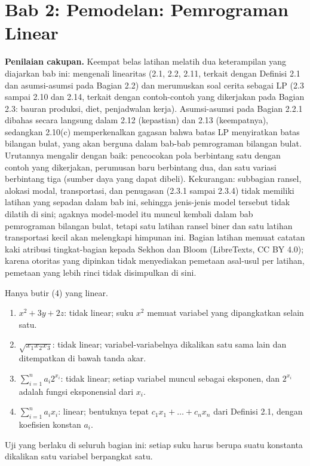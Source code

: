 \section{Bab 2: Pemodelan: Pemrograman Linear}

\textbf{Penilaian cakupan.} Keempat belas latihan melatih dua keterampilan yang diajarkan bab ini: mengenali linearitas (2.1, 2.2, 2.11, terkait dengan Definisi 2.1 dan asumsi-asumsi pada Bagian 2.2) dan merumuskan soal cerita sebagai LP (2.3 sampai 2.10 dan 2.14, terkait dengan contoh-contoh yang dikerjakan pada Bagian 2.3: bauran produksi, diet, penjadwalan kerja). Asumsi-asumsi pada Bagian 2.2.1 dibahas secara langsung dalam 2.12 (kepastian) dan 2.13 (keempatnya), sedangkan 2.10(c) memperkenalkan gagasan bahwa batas LP menyiratkan batas bilangan bulat, yang akan berguna dalam bab-bab pemrograman bilangan bulat. Urutannya mengalir dengan baik: pencocokan pola berbintang satu dengan contoh yang dikerjakan, perumusan baru berbintang dua, dan satu variasi berbintang tiga (sumber daya yang dapat dibeli). Kekurangan: subbagian ransel, alokasi modal, transportasi, dan penugasan (2.3.1 sampai 2.3.4) tidak memiliki latihan yang sepadan dalam bab ini, sehingga jenis-jenis model tersebut tidak dilatih di sini; agaknya model-model itu muncul kembali dalam bab pemrograman bilangan bulat, tetapi satu latihan ransel biner dan satu latihan transportasi kecil akan melengkapi himpunan ini. Bagian latihan memuat catatan kaki atribusi tingkat-bagian kepada Sekhon dan Bloom (LibreTexts, CC BY 4.0); karena otoritas yang dipinkan tidak menyediakan pemetaan asal-usul per latihan, pemetaan yang lebih rinci tidak disimpulkan di sini.


Hanya butir (4) yang linear.
\begin{enumerate}
\item $x^2 + 3y + 2z$: tidak linear; suku $x^2$ memuat variabel yang dipangkatkan selain satu.
\item $\sqrt{x_1 x_2 x_3}$: tidak linear; variabel-variabelnya dikalikan satu sama lain dan ditempatkan di bawah tanda akar.
\item $\sum_{i=1}^n a_i 2^{x_i}$: tidak linear; setiap variabel muncul sebagai eksponen, dan $2^{x_i}$ adalah fungsi eksponensial dari $x_i$.
\item $\sum_{i=1}^n a_i x_i$: linear; bentuknya tepat $c_1 x_1 + \dots + c_n x_n$ dari Definisi 2.1, dengan koefisien konstan $a_i$.
\end{enumerate}
Uji yang berlaku di seluruh bagian ini: setiap suku harus berupa suatu konstanta dikalikan satu variabel berpangkat satu.


